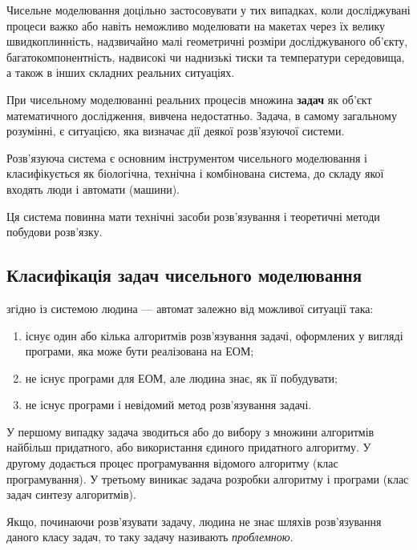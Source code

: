 \begin{example}
    Чисельне моделювання доцільно застосовувати у тих випадках, коли досліджувані процеси важко або навіть неможливо моделювати на макетах через їх велику швидкоплинність, надзвичайно малі геометричні розміри досліджуваного об'єкту, багатокомпонентність, надвисокі чи наднизькі тиски та температури середовища, а також в інших складних реальних ситуаціях.
\end{example}

При чисельному моделюванні реальних процесів множина \textbf{задач} як об'єкт математичного дослідження, вивчена недостатньо. Задача, в самому загальному розумінні, є ситуацією, яка визначає дії деякої розв'язуючої системи. 

\begin{definition}
    Розв'язуюча система є основним інструментом чисельного моделювання і класифікується як біологічна, технічна і комбінована система, до складу якої входять люди і автомати (машини). \medskip
    
    Ця система повинна мати технічні засоби розв'язування і теоретичні методи побудови розв'язку.
\end{definition}

\subsection{Класифікація задач чисельного моделювання} згідно із системою \guillemotleft{}людина --- автомат\guillemotright{} залежно від можливої ситуації така: 
\begin{enumerate}
    \item існує один або кілька алгоритмів розв'язування задачі, оформлених у вигляді програми, яка може бути реалізована на ЕОМ; 
    \item не існує програми для ЕОМ, але людина знає, як її побудувати; 
    \item не існує програми і невідомий метод розв'язування задачі. 
\end{enumerate}

У першому випадку задача зводиться або до вибору з множини алгоритмів найбільш придатного, або використання єдиного придатного алгоритму. У другому додається процес програмування відомого алгоритму (клас програмування). У третьому виникає задача розробки алгоритму і програми (клас задач синтезу алгоритмів).

\begin{definition}
    Якщо, починаючи розв'язувати задачу, людина не знає шляхів роз\-в'я\-зу\-ван\-ня даного класу задач, то таку задачу називають \textit{проблемною}.
\end{definition}

